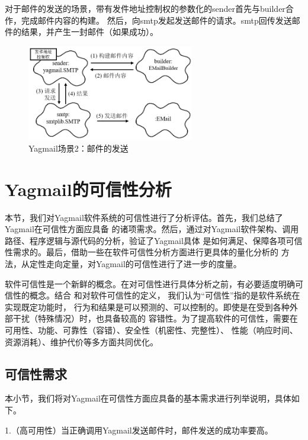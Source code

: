 \documentclass[UTF8,12pt,a4paper]{ctexart}
\begin{document}
    对于邮件的发送的场景，带有发件地址控制权的参数化的sender首先与builder合作，完成邮件内容的构建。
    然后，向smtp发起发送邮件的请求。smtp回传发送邮件的结果，并产生一封邮件（如果成功）。
    \begin{figure}[H]
        \centering
        \includegraphics[width=0.65\textwidth]{figure/scene-2.png}
        \caption{Yagmail场景2：邮件的发送}
        \label{fig:scene-2}
    \end{figure}
    
\newpage
\section{Yagmail的可信性分析}

    本节，我们对Yagmail软件系统的可信性进行了分析评估。首先，我们总结了Yagmail在可信性方面应具备
    的诸项需求。然后，通过对Yagmail软件架构、调用路径、程序逻辑与源代码的分析，验证了Yagmail具体
    是如何满足、保障各项可信性需求的。最后，借助一些在软件可信性分析方面进行更具体的量化分析的
    方法，从定性走向定量，对Yagmail的可信性进行了进一步的度量。
    
    软件可信性是一个新鲜的概念。在对可信性进行具体分析之前，有必要适度明确可信性的概念。结合
    \cite{researchreview}和\cite{courseware}对软件可信性的定义，
    我们认为“可信性”指的是软件系统在实现既定功能时，
    行为和结果是可以预测的、可以控制的。即使是在受到各种外部干扰（特殊情况）时，也具备较高的
    容错性。为了提高软件的可信性，需要在可用性、功能、可靠性（容错）、安全性（机密性、完整性）、
    性能（响应时间、资源消耗）、维护代价等多方面共同优化。

\subsection{可信性需求}

    本小节，我们将对Yagmail在可信性方面应具备的基本需求进行列举说明，具体如下。

    1.（高可用性）当正确调用Yagmail发送邮件时，邮件发送的成功率要高。
    
\end{document}
